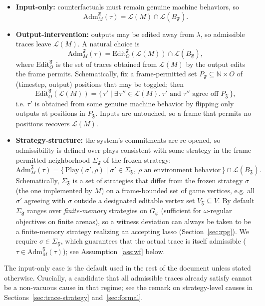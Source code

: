 \documentclass[11pt]{article}
\theoremstyle{remark}
\newcommand{\Lang}{\mathcal{L}}
\newcommand{\Nat}{\mathbb{N}}
\newcommand{\Frame}{\mathfrak{F}}
\newcommand{\Adm}{\mathrm{Adm}}
\begin{document}
\begin{itemize}
  \item \textbf{Input-only:} counterfactuals must remain genuine machine
        behaviors, so
        \[
          \Adm_M^{\Frame}(\tau)=\Lang(M)\cap\Lang(B_{\Frame}).
        \]
  \item \textbf{Output-intervention:} outputs may be edited away from
        \(\lambda\), so admissible traces leave \(\Lang(M)\). A natural choice is
        \[
          \Adm_M^{\Frame}(\tau)=\mathrm{Edit}_{O}^{\Frame}(\Lang(M))\cap\Lang(B_{\Frame}),
        \]
        where \(\mathrm{Edit}_{O}^{\Frame}\) is the set of traces obtained from
        \(\Lang(M)\) by the output edits the frame permits. Schematically, fix a
        frame-permitted set \(P_{\Frame}\subseteq\Nat\times O\) of
        (timestep, output) positions that may be toggled; then
        \[
          \mathrm{Edit}_{O}^{\Frame}(\Lang(M))
          =\{\,\tau'\mid \exists\,\tau''\in\Lang(M).\ \tau' \text{ and } \tau''
          \text{ agree off } P_{\Frame}\,\},
        \]
        i.e. \(\tau'\) is obtained from some genuine machine behavior by flipping
        only outputs at positions in \(P_{\Frame}\). Inputs are untouched, so a
        frame that permits no positions recovers \(\Lang(M)\).
  \item \textbf{Strategy-structure:} the system's commitments are re-opened, so
        admissibility is defined over plays consistent with some strategy in the
        frame-permitted neighborhood \(\Sigma_{\Frame}\) of the frozen strategy:
        \[
          \Adm_M^{\Frame}(\tau)=
          \{\,\mathrm{Play}(\sigma',\rho)\mid \sigma'\in\Sigma_{\Frame},\ \rho\text{ an environment behavior}\,\}
          \cap\Lang(B_{\Frame}).
        \]
        Schematically, \(\Sigma_{\Frame}\) is a set of strategies that differ
        from the frozen strategy \(\sigma\) (the one implemented by \(M\)) on a
        frame-bounded set of game vertices, e.g. all \(\sigma'\) agreeing with
        \(\sigma\) outside a designated editable vertex set \(V_{\Frame}\subseteq
        V\). By default \(\Sigma_{\Frame}\) ranges over \emph{finite-memory}
        strategies on \(G_\varphi\) (sufficient for \(\omega\)-regular objectives
        on finite arenas), so a witness deviation can always be taken to be a
        finite-memory strategy realizing an accepting lasso
        (Section~\ref{sec:rpg}). We require \(\sigma\in\Sigma_{\Frame}\), which guarantees that the
        actual trace is itself admissible (\(\tau\in\Adm_M^{\Frame}(\tau)\)); see
        Assumption~\ref{ass:wf} below.
\end{itemize}
The input-only case is the default used in the rest of the document unless
stated otherwise. Crucially, a candidate that all admissible traces already
satisfy cannot be a non-vacuous cause in that regime; see the remark on
strategy-level causes in Sections~\ref{sec:trace-strategy}
and~\ref{sec:formal}.
\end{document}
